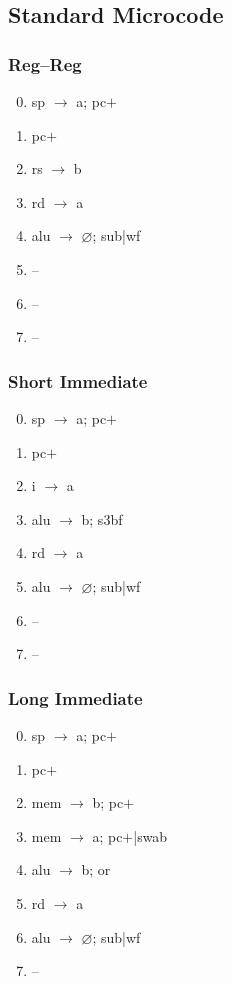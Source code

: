 \documentclass[11pt]{book}
\let\emptyset\varnothing
\begin{document}
\subsection*{Standard Microcode}
\begin{multicols}{3}\ttfamily\selectfont\small
  \subsubsection*{Reg--Reg}
  \begin{enumerate}\setcounter{enumi}{-1}
  \item sp \(\rightarrow\) a; pc\(+\)
  \item pc\(+\)
  \item rs \(\rightarrow\) b
  \item rd \(\rightarrow\) a
  \item alu \(\rightarrow\) \(\emptyset\); sub|wf
  \item --
  \item --
  \item --
  \end{enumerate}
  \columnbreak
  \subsubsection*{Short Immediate}
  \begin{enumerate}\setcounter{enumi}{-1}
  \item sp \(\rightarrow\) a; pc\(+\)
  \item pc\(+\)
  \item i \(\rightarrow\) a
  \item alu \(\rightarrow\) b; s3bf
  \item rd \(\rightarrow\) a
  \item alu \(\rightarrow\) \(\emptyset\); sub|wf
  \item --
  \item --
  \end{enumerate}
  \columnbreak
  \subsubsection*{Long Immediate}
  \begin{enumerate}\setcounter{enumi}{-1}
  \item sp \(\rightarrow\) a; pc\(+\)
  \item pc\(+\)
  \item mem \(\rightarrow\) b; pc\(+\)
  \item mem \(\rightarrow\) a; pc\(+\)|swab
  \item alu \(\rightarrow\) b; or
  \item rd \(\rightarrow\) a
  \item alu \(\rightarrow\) \(\emptyset\); sub|wf
  \item --
  \end{enumerate}
\end{multicols}
\end{document}
